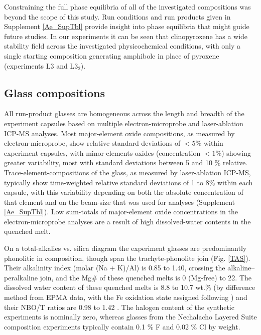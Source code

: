 \documentclass[review,authoryear,12pt]{elsarticle}
\begin{document}
Constraining the full phase equilibria of all of the investigated compositions was beyond the scope of this study. Run conditions and run products given in Supplement \ref{Ae_SupTbl} provide insight into phase equilibria that might guide future studies. In our experiments it can be seen that clinopyroxene has a wide stability field across the investigated physicochemical conditions, with only a single starting composition generating amphibole in place of pyroxene (experiments L3 and L$3_2$).

\subsection{Glass compositions}

All run-product glasses are homogeneous across the length and breadth of the experiment capsules based on multiple electron-microprobe and laser-ablation ICP-MS analyses. Most major-element oxide compositions, as measured by electron-microprobe, show relative standard deviations of $<5\%$ within experiment capsules, with minor-elements oxides (concentration $<1\%$) showing greater variability, most with standard deviations between 5 and 10 \% relative. Trace-element-compositions of the glass, as measured by laser-ablation ICP-MS, typically show time-weighted relative standard deviations of 1 to 8\% within each capsule, with this variability depending on both the absolute concentration of that element and on the beam-size that was used for analyses (Supplement \ref{Ae_SupTbl}). Low sum-totals of major-element oxide concentrations in the electron-microprobe analyses are a result of high dissolved-water contents in the quenched melt.

On a total-alkalies vs. silica diagram the experiment glasses are predominantly phonolitic in composition, though span the trachyte-phonolite join (Fig. \ref{TAS}). 
Their alkalinity index (molar (Na + K)/Al) is 0.85 to 1.40, crossing the alkaline--peralkaline join, and the Mg\# of these quenched melts is 0 (Mg-free) to 22. The dissolved water content of these quenched melts is 8.8 to 10.7 wt.\% (by difference method from EPMA data, with the Fe oxidation state assigned following \citealt{Kress1991}) and their NBO/T ratios are 0.98 to 1.42 \citep{Mysen1982,Mysen1985}. The halogen content of the synthetic experiments is nominally zero, whereas glasses from the Nechalacho Layered Suite composition experiments typically contain 0.1 \% F and 0.02 \% Cl by weight.
\end{document}
